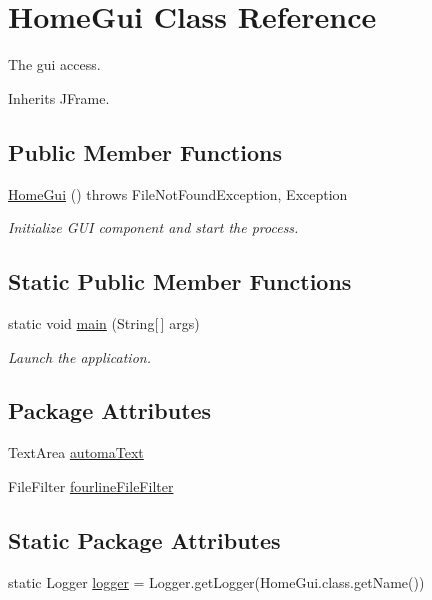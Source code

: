 \hypertarget{class_home_gui}{\section{Home\-Gui Class Reference}
\label{class_home_gui}
}


The gui access.  




Inherits J\-Frame.

\subsection*{Public Member Functions}
\begin{DoxyCompactItemize}
\item 
\hyperlink{class_home_gui_add92e1cf71983b9cc6f70f040d3ea593}{Home\-Gui} ()  throws File\-Not\-Found\-Exception, Exception 
\begin{DoxyCompactList}\small\item\em Initialize G\-U\-I component and start the process. \end{DoxyCompactList}\end{DoxyCompactItemize}
\subsection*{Static Public Member Functions}
\begin{DoxyCompactItemize}
\item 
static void \hyperlink{class_home_gui_a241867731938068ae82ae7d5e7371fa3}{main} (String\mbox{[}$\,$\mbox{]} args)
\begin{DoxyCompactList}\small\item\em Launch the application. \end{DoxyCompactList}\end{DoxyCompactItemize}
\subsection*{Package Attributes}
\begin{DoxyCompactItemize}
\item 
Text\-Area \hyperlink{class_home_gui_a6b00edbcb893105ddc5e3b2beb4c2dca}{automa\-Text}
\item 
File\-Filter \hyperlink{class_home_gui_a7f56e390a2982689b92cee117f50e987}{fourline\-File\-Filter}
\end{DoxyCompactItemize}
\subsection*{Static Package Attributes}
\begin{DoxyCompactItemize}
\item 
static Logger \hyperlink{class_home_gui_a6eef831dc2ff4533740f3395c4b9067a}{logger} = Logger.\-get\-Logger(Home\-Gui.\-class.\-get\-Name())
\end{DoxyCompactItemize}
